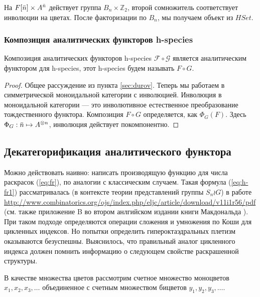 На $F[\Bar n] \times A^{\Bar n}$ действует группа $B_n \times
\mathbb Z_2$, второй сомножитель соответствует инволюции на цветах. После
факторизации по $B_n$, мы получаем объект из $HSet$.

\subsubsection{Композиция аналитических функторов h-species}
\begin{theorem}
Композиция аналитических функторов h-species $\mathcal F \circ \mathcal G$
является аналитическим функтором для h-species, этот h-species будем называть $F
\circ G$.
\end{theorem}
\begin{proof}
Общее рассуждение из пункта \ref{sec:durov}. Теперь мы работаем в симметрической
моноидальной категории с инволюцией. Инволюция в моноидальной категории --- это
инволютивное естественное преобразование тождественного функтора. Композиция
$F \circ G$ определяется, как $\Phi_G(F)$. Здесь $\Phi_G : \Bar n \mapsto
A^{\otimes n}$, инволюция действует покомпонентно.
\end{proof}

\subsection{Декатегорификация аналитического функтора} 
Можно действовать наивно: написать производящую функцию для числа раскрасок
(\ref{eq:fr}), по аналогии с классическим случаем. Такая формула
(\ref{eq:h-fr1}) рассматривалась (в контексте теории представлений группы $S_n \wr G$) в работе
\url{http://www.combinatorics.org/ojs/index.php/eljc/article/download/v11i1r56/pdf}
(см. также приложение B во втором анлгийском издании книги Макдональда
\cite{Mac2}). При таком подходе определяются операции сложения и умножения
по Коши для цикленных индексов. Но попытки определить
гипероктаэдральных плетизм оказываются безуспешны. Выяснилось, что правильный аналог цикленного
индекса должен помнить информацию о следующем свойстве раскрашенной структуры.

В качестве множества цветов рассмотрим счетное множество моноцветов $x_1,
x_2, x_3, \dots$ объединенное с счетным множеством бицветов $y_1, y_2, y_3, \dots$.


